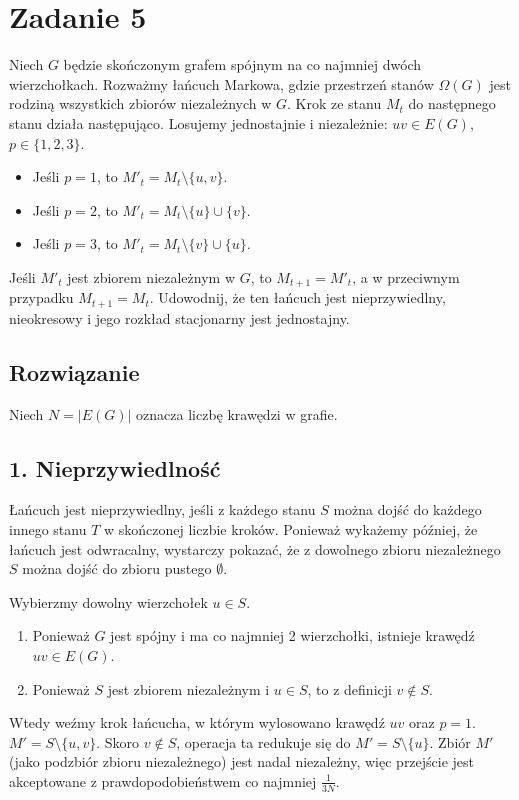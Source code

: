 \section{Zadanie 5}
Niech \(G\) będzie skończonym grafem spójnym na co najmniej dwóch wierzchołkach. Rozważmy łańcuch Markowa, gdzie przestrzeń stanów \(\Omega(G)\) jest rodziną wszystkich zbiorów niezależnych w \(G\). Krok ze stanu \(M_t\) do następnego stanu działa następująco. Losujemy jednostajnie i niezależnie: \(uv \in E(G)\), \(p \in \{1, 2, 3\}\).
\begin{itemize}
	\item Jeśli \(p = 1\), to \(M'_t = M_t \setminus \{u, v\}\).
	\item Jeśli \(p = 2\), to \(M'_t = M_t \setminus \{u\} \cup \{v\}\).
	\item Jeśli \(p = 3\), to \(M'_t = M_t \setminus \{v\} \cup \{u\}\).
\end{itemize}
Jeśli \(M'_t\) jest zbiorem niezależnym w \(G\), to \(M_{t+1} = M'_t\), a w przeciwnym przypadku \(M_{t+1} = M_t\). Udowodnij, że ten łańcuch jest nieprzywiedlny, nieokresowy i jego rozkład stacjonarny jest jednostajny.

\subsection*{Rozwiązanie}
Niech \(N = |E(G)|\) oznacza liczbę krawędzi w grafie.

\subsection*{1. Nieprzywiedlność}

Łańcuch jest nieprzywiedlny, jeśli z każdego stanu \(S\) można dojść do każdego innego stanu \(T\) w skończonej liczbie kroków. Ponieważ wykażemy później, że łańcuch jest odwracalny, wystarczy pokazać, że z dowolnego zbioru niezależnego \(S\) można dojść do zbioru pustego \(\emptyset\).

Wybierzmy dowolny wierzchołek \(u \in S\).
\begin{enumerate}
	\item Ponieważ \(G\) jest spójny i ma co najmniej 2 wierzchołki, istnieje krawędź \(uv \in E(G)\).
	\item Ponieważ \(S\) jest zbiorem niezależnym i \(u \in S\), to z definicji \(v \notin S\).
\end{enumerate}

Wtedy weźmy krok łańcucha, w którym wylosowano krawędź \(uv\) oraz \(p=1\).
\(M' = S \setminus \{u, v\}\). Skoro \(v \notin S\), operacja ta redukuje się do \(M' = S \setminus \{u\}\). Zbiór \(M'\) (jako podzbiór zbioru niezależnego) jest nadal niezależny, więc przejście jest akceptowane z prawdopodobieństwem co najmniej \(\frac{1}{3N}\).

